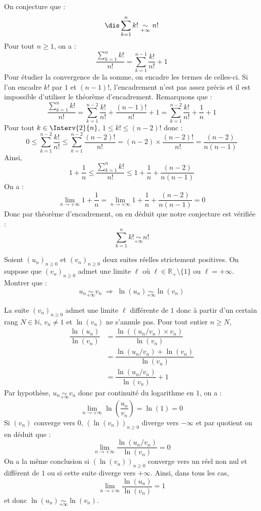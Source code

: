 \documentclass[a4paper,10pt]{report}
\begin{document}
\corr On conjecture que :
$$ \dis \sum_{k=1}^n k! \underset{+ \infty}{\sim} n! $$
Pour tout $n \geq 1$, on a :
$$\dfrac{\sum_{k=1}^n k!}{n!}  = \sum_{k=1}^{n-1} \dfrac{k!}{n!} + 1 $$
Pour étudier la convergence de la somme, on encadre les termes de celles-ci. Si l'on encadre $k!$ par $1$ et $(n-1)!$, l'encadrement n'est pas assez précis et il est impossible d'utiliser le théorème d'encadrement. Remarquons que :
$$ \dfrac{\sum_{k=1}^n k!}{n!}  = \sum_{k=1}^{n-2} \dfrac{k!}{n!} + \dfrac{(n-1)!}{n!} + 1 = \sum_{k=1}^{n-2} \dfrac{k!}{n!} + \dfrac{1}{n} + 1 $$
Pour tout $k \in \Interv{2}{n}$, $1 \leq k! \leq (n-2)!$ donc :
$$ 0 \leq \sum_{k=1}^{n-2} \dfrac{k!}{n!} \leq \sum_{k=1}^{n-2} \dfrac{(n-2)!}{n!} = (n-2) \times \dfrac{(n-2)!}{n!} = \dfrac{(n-2)}{n(n-1)}$$
Ainsi,
$$ 1+ \dfrac{1}{n} \leq \dfrac{\sum_{k=1}^n k!}{n!} \leq 1 + \dfrac{1}{n} + \dfrac{(n-2)}{n(n-1)}$$
On a :
$$ \lim_{n \rightarrow + \infty} 1+ \dfrac{1}{n} =  \lim_{n \rightarrow + \infty} 1+ \dfrac{1}{n} + \dfrac{(n-2)}{n(n-1)} = 0$$
Donc par théorème d'encadrement, on en déduit que notre conjecture est vérifiée :
$$ \sum_{k=1}^n k! \underset{+ \infty}{\sim} n! $$

\medskip

%


\begin{Exercice}{} Soient $(u_n)_{n \geq 0}$ et $(v_n)_{n \geq 0}$ deux suites réelles strictement positives. On suppose que $(v_n)_{n \geq 0}$ admet une limite $\ell$ où $\ell \in \mathbb{R}_+\setminus \lbrace 1 \rbrace$ ou $\ell= + \infty$. Montrer que :
$$ u_n \underset{+ \infty}{\sim} v_n \; \Longrightarrow  \; \ln(u_n) \underset{+ \infty}{\sim} \ln(v_n)$$
\end{Exercice}

\corr La suite $(v_n)_{n \geq 0}$ admet une limite $\ell$ différente de $1$ donc à partir d'un certain rang $N \in \mathbb{N}$, $v_n \neq 1$ et $\ln(v_n)$ ne s'annule pas. Pour tout entier $n \geq N$,
\begin{align*}
 \dfrac{\ln(u_n)}{\ln(v_n)} & = \dfrac{\ln((u_n/v_n)\times v_n)}{\ln(v_n)} \\
 & = \dfrac{\ln(u_n/v_n) + \ln(v_n)}{\ln(v_n)} \\
 & = \dfrac{\ln(u_n/v_n)}{\ln(v_n)} + 1 
 \end{align*}
Par hypothèse, $u_n \underset{+ \infty}{\sim} v_n$ donc par continuité du logarithme en $1$, on a :
$$ \lim_{n \rightarrow + \infty} \ln \left( \dfrac{u_n}{v_n} \right) = \ln(1)=0$$
Si $(v_n)$ converge vers $0$, $(\ln(v_n))_{n \geq 0}$ diverge vers $- \infty$ et par quotient on en déduit que :
$$ \lim_{n \rightarrow + \infty} \dfrac{\ln(u_n/v_n)}{\ln(v_n)} = 0$$
On a la même conclusion si $(\ln(v_n))_{n \geq 0}$ converge vers un réel non nul et différent de $1$ ou si cette suite diverge vers $+ \infty$. Ainsi, dans tous les cas, 
$$ \lim_{n \rightarrow + \infty}  \dfrac{\ln(u_n)}{\ln(v_n)} = 1$$
et donc $\ln(u_n) \underset{+ \infty}{\sim} \ln(v_n)$.
\end{document}
